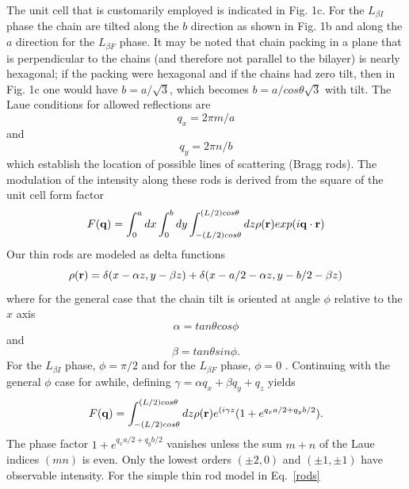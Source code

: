 The unit cell that is customarily employed is indicated in Fig. 1c.  
For the $L_{{\beta}I}$ phase the chain are tilted along the $b$ direction 
as shown in Fig. 1b and along the $a$ direction for the $L_{{\beta}F}$ phase.  
It may be noted that chain packing in a plane that is perpendicular to the 
chains (and therefore not parallel to the bilayer) is nearly hexagonal; if 
the packing were hexagonal and if the chains had zero tilt, then in Fig. 1c 
one would have $b=a/\sqrt{3}$, which becomes $b=a/cos{\theta}\sqrt{3}$ with tilt.  
The Laue conditions for allowed reflections are 
\begin{equation}\label{Laue1}
q_x=2{\pi}m/a 
\end{equation}
and
\begin{equation}\label{Laue2}
q_y=2{\pi}n/b 
\end{equation}
which establish the location of possible lines of scattering (Bragg rods). 
The modulation of the intensity along these rods is derived from the square 
of the unit cell form factor
\begin{equation}\label{S(q)}
F(\mathbf{q}) = \int_{0}^{a}dx\int_{0}^{b}dy\int_{-(L/2)cos{\theta}}^{(L/2)cos{\theta}}dz\rho(\bold{r})exp(i\bold{q}\cdot\bold{r})
\end{equation}
Our thin rods are modeled as delta functions
\begin{equation}\label{rods}
\rho(\bold{r})=\delta(x-{\alpha}z,y-{\beta}z)+\delta(x-a/2-{\alpha}z,y-b/2-{\beta}z)
\end{equation}
where for the general case that the chain tilt is oriented at angle $\phi$ 
relative to the $x$ axis 
\begin{equation}\label{alpha}
\alpha=tan{\theta}cos{\phi}
\end{equation}
and
\begin{equation}\label{beta}
\beta=tan{\theta}sin{\phi}.
\end{equation}
For the $L_{{\beta}I}$ phase, $\phi={\pi}/2$ and for the $L_{{\beta}F}$ phase, 
$\phi=0$ .  Continuing with the general $\phi$ case for awhile,
defining $\gamma = {\alpha}q_x+{\beta}q_y+q_z$ yields
\begin{equation}\label{S(q)}
F(\bold{q}) = \int_{-(L/2)cos{\theta}}^{(L/2)cos{\theta}}dz\rho(\bold{r})e^{(i{\gamma}z}(1+e^{q_xa/2+q_yb/2}).
\end{equation}
The phase factor $1+e^{q_xa/2+q_yb/2}$ vanishes unless the sum $m+n$ of the 
Laue indices $(mn)$ is even. Only the lowest orders $(\pm2,0)$ and $(\pm1,\pm1)$ 
have observable intensity.  For the simple thin rod model in Eq.~\ref{rods} 
